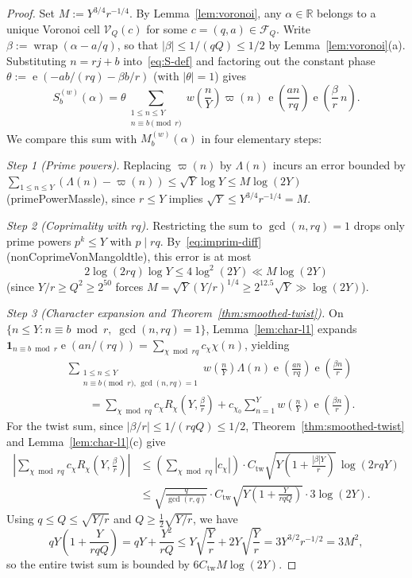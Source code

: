 \documentclass[11pt,reqno]{amsart}
\numberwithin{equation}{section}
\theoremstyle{definition}
\newcommand{\R}{\mathbb{R}}
\newcommand{\1}{\mathbf{1}}
\newcommand{\e}{\operatorname{e}}
\newcommand{\V}{\mathcal{V}}
\newcommand{\lean}[1]{{\footnotesize\ttfamily\renewcommand{\_}{\textunderscore\allowbreak}#1}}
\begin{document}
\begin{proof}
Set $M := Y^{3/4} r^{-1/4}$. By Lemma~\ref{lem:voronoi}, any $\alpha \in \R$ belongs to a unique Voronoi cell $\V_Q(c)$ for some $c = (q, a) \in \mathcal{F}_Q$. Write $\beta := \operatorname{wrap}(\alpha - a/q)$, so that $|\beta| \le 1/(qQ) \le 1/2$ by Lemma~\ref{lem:voronoi}(a). Substituting $n = r j + b$ into~\eqref{eq:S-def} and factoring out the constant phase $\theta := \e(-ab/(rq) - \beta b/r)$ (with $|\theta| = 1$) gives
\[
  S_b^{(w)}(\alpha) = \theta \sum_{\substack{1 \le n \le Y \\ n \equiv b \pmod r}} w\!\left(\frac{n}{Y}\right) \varpi(n)\, \e\!\left(\frac{a n}{r q}\right)\e\!\left(\frac{\beta}{r}\, n\right).
\]
We compare this sum with $M_b^{(w)}(\alpha)$ in four elementary steps:

\emph{Step 1 (Prime powers).} Replacing $\varpi(n)$ by $\Lambda(n)$ incurs an error bounded by $\sum_{1 \le n \le Y} (\Lambda(n) - \varpi(n)) \le \sqrt{Y}\log Y \le M\log(2Y)$ (\lean{primePowerMass\_le}), since $r \le Y$ implies $\sqrt{Y} \le Y^{3/4}r^{-1/4} = M$.

\emph{Step 2 (Coprimality with $rq$).} Restricting the sum to $\gcd(n, rq) = 1$ drops only prime powers $p^k \le Y$ with $p \mid rq$. By~\eqref{eq:imprim-diff} (\lean{nonCoprimeVonMangoldt\_le}), this error is at most
\[
  2\log(2rq)\log Y \le 4\log^2(2Y) \ll M\log(2Y)
\]
(since $Y/r \ge Q^2 \ge 2^{50}$ forces $M = \sqrt{Y}(Y/r)^{1/4} \ge 2^{12.5}\sqrt{Y} \gg \log(2Y)$).

\emph{Step 3 (Character expansion and Theorem~\ref{thm:smoothed-twist}).} On $\{n \le Y : n \equiv b \bmod r,\; \gcd(n, rq) = 1\}$, Lemma~\ref{lem:char-l1} expands $\1_{n \equiv b \bmod r}\e(an/(rq)) = \sum_{\chi \bmod rq} c_\chi \chi(n)$, yielding
\begin{align*}
  &\sum_{\substack{1 \le n \le Y \\ n \equiv b \pmod r,\, \gcd(n, rq)=1}} w\!\left(\frac{n}{Y}\right)\Lambda(n)\e\!\left(\frac{an}{rq}\right)\e\!\left(\frac{\beta n}{r}\right) \\
  &\qquad = \sum_{\chi \bmod rq} c_\chi R_\chi\!\left(Y, \frac{\beta}{r}\right) + c_{\chi_0} \sum_{n=1}^Y w\!\left(\frac{n}{Y}\right)\e\!\left(\frac{\beta n}{r}\right).
\end{align*}
For the twist sum, since $|\beta/r| \le 1/(rqQ) \le 1/2$, Theorem~\ref{thm:smoothed-twist} and Lemma~\ref{lem:char-l1}(c) give
\begin{align*}
  \left|\sum_{\chi \bmod rq} c_\chi R_\chi\!\left(Y, \frac{\beta}{r}\right)\right|
  &\le \left(\sum_{\chi \bmod rq} |c_\chi|\right) \cdot C_{\mathrm{tw}} \sqrt{Y\!\left(1 + \frac{|\beta| Y}{r}\right)}\,\log(2 r q Y) \\
  &\le \sqrt{\frac{q}{\gcd(r,q)}} \cdot C_{\mathrm{tw}} \sqrt{Y\!\left(1 + \frac{Y}{r q Q}\right)} \cdot 3\log(2Y).
\end{align*}
Using $q \le Q \le \sqrt{Y/r}$ and $Q \ge \frac{1}{2}\sqrt{Y/r}$, we have
\[
  q Y\!\left(1 + \frac{Y}{r q Q}\right) = q Y + \frac{Y^2}{r Q} \le Y\sqrt{\frac{Y}{r}} + 2 Y\sqrt{\frac{Y}{r}} = 3 Y^{3/2} r^{-1/2} = 3 M^2,
\]
so the entire twist sum is bounded by $6 C_{\mathrm{tw}} M \log(2Y)$.


\end{proof}
\end{document}
